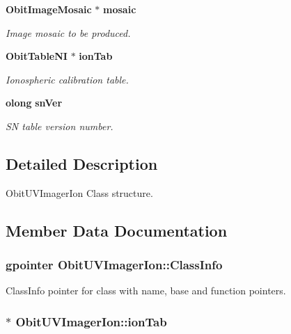 \begin{CompactItemize}
{\bf Obit\-Image\-Mosaic} $\ast$ {\bf mosaic}
\begin{CompactList}\small\item\em Image mosaic to be produced. \item\end{CompactList}\item 
{\bf Obit\-Table\-NI} $\ast$ {\bf ion\-Tab}
\begin{CompactList}\small\item\em Ionospheric calibration table. \item\end{CompactList}\item 
{\bf olong} {\bf sn\-Ver}
\begin{CompactList}\small\item\em SN table version number. \item\end{CompactList}\end{CompactItemize}


\subsection{Detailed Description}
Obit\-UVImager\-Ion Class structure. 



\subsection{Member Data Documentation}
\subsubsection{\setlength{\rightskip}{0pt plus 5cm}gpointer {\bf Obit\-UVImager\-Ion::Class\-Info}}\label{structObitUVImagerIon_o1}


Class\-Info pointer for class with name, base and function pointers. 

\subsubsection{$\ast$ {\bf Obit\-UVImager\-Ion::ion\-Tab}}\label{structObitUVImagerIon_o7}


